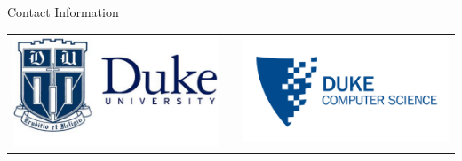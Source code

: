 \documentclass[final]{beamer}
\newlength{\onecolwid}
\begin{document}
\begin{frame}[t]
\begin{columns}[t]
\begin{column}{\onecolwid}
\begin{alertblock}{Contact Information}
\end{alertblock}

\begin{center}
\begin{tabular}{ccc}
\includegraphics[width=0.4\linewidth]{duke_logo_6.png} & \hfill & \includegraphics[width=0.4\linewidth]{duke_cs_logo_huge.png}
\end{tabular}
\end{center}


\end{column} %

\end{columns} %

\end{frame} %
\end{document}
